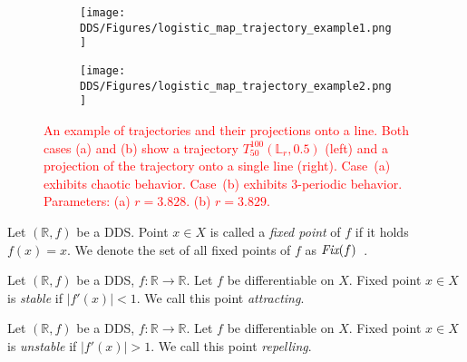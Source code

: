 \begin{figure}[!h]
    \centering
    \begin{subfigure}{0.495\textwidth}
        \centering
        \texttt{[image: DDS/Figures/logistic\_map\_trajectory\_example1.png]}
        \caption{}
    \end{subfigure}
    \hfill
    \begin{subfigure}{0.495\textwidth}
        \centering
        \texttt{[image: DDS/Figures/logistic\_map\_trajectory\_example2.png]}
        \caption{}
    \end{subfigure}

    \caption{
        \textcolor{red}{ 
        An example of trajectories and their projections onto a line. 
        Both cases (a) and (b) show a trajectory $T_{50}^{100}(\mathbb{L}_{r}, 0.5)$ (left) and a projection of the trajectory onto a single line (right). 
        Case~(a) exhibits chaotic behavior.
        Case~(b) exhibits $3$-periodic behavior.
        Parameters: 
        (a) $r = 3.828$. 
        (b) $r = 3.829$. 
        }
    }
    \label{fig:trajectory_example}
\end{figure}

\label{def:fixed point}
\begin{definition}
    Let $\left( \mathbb{R}, f \right)$ be a DDS. Point $x \in X$ is called a \emph{fixed point} of $f$ if it holds $f(x) = x$.
    We denote the set of all fixed points of $f$ as $\emph{Fix}(f)$~\cite{Devaney20211026}.
\end{definition}

\label{def:sfp}
\begin{definition}
    Let $\left(\mathbb{R}, f\right)$ be a DDS, $f:\mathbb{R} \rightarrow \mathbb{R}$. Let $f$ be differentiable on $X$. Fixed point $x \in X$ is \emph{stable} if $|f'(x)| < 1$.
    We call this point \emph{attracting}.
\end{definition}

\label{def:ufp}
\begin{definition}
    Let $\left(\mathbb{R}, f\right)$ be a DDS, $f:\mathbb{R} \rightarrow \mathbb{R}$. Let $f$ be differentiable on $X$. Fixed point $x \in X$ is \emph{unstable} if $|f'(x)| > 1$.
    We call this point \emph{repelling}.
\end{definition}

